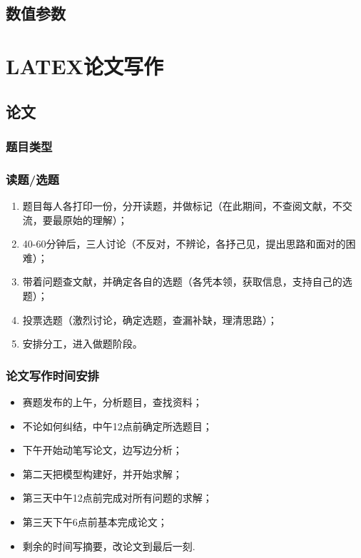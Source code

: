 \documentclass[openany]{progbookcn}
\begin{document}
\chapter{数值参数}
\part{LATEX论文写作}
\chapter{论文}
\section{题目类型}
\section{读题/选题}
\begin{enumerate}
    \item 题目每人各打印一份，分开读题，并做标记（在此期间，不查阅文献，不交流，要最原始的理解）；
    \item 40-60分钟后，三人讨论（不反对，不辨论，各抒己见，提出思路和面对的困难）；
    \item 带着问题查文献，并确定各自的选题（各凭本领，获取信息，支持自己的选题）；
    \item 投票选题（激烈讨论，确定选题，查漏补缺，理清思路）；
    \item 安排分工，进入做题阶段。
\end{enumerate}
\section{论文写作时间安排}
\begin{itemize}
    \item 赛题发布的上午，分析题目，查找资料；
    \item 不论如何纠结，中午12点前确定所选题目；
    \item 下午开始动笔写论文，边写边分析；
    \item 第二天把模型构建好，并开始求解；
    \item 第三天中午12点前完成对所有问题的求解；
    \item 第三天下午6点前基本完成论文；
    \item 剩余的时间写摘要，改论文到最后一刻.
\end{itemize}
\end{document}
